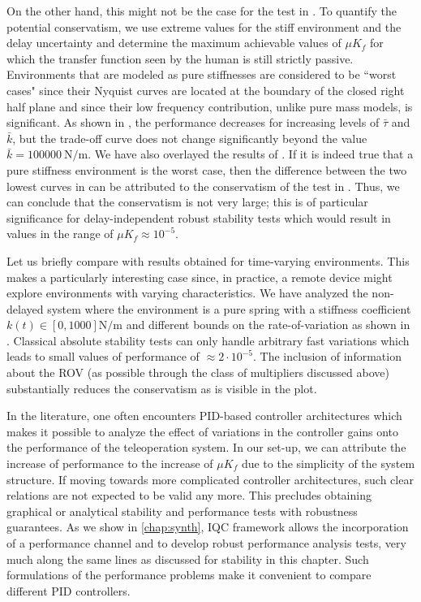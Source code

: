 On the other hand, this might not be the case for the test in . To
quantify the potential conservatism, we use extreme values for
the stiff environment and the delay uncertainty and determine
the maximum achievable values of $\mu K_f$ for which the transfer
function seen by the human is still strictly passive. Environments that
are modeled as pure stiffnesses are considered to be ``worst
cases" since their Nyquist curves are located at the boundary
of the closed right half plane and since their low frequency
contribution, unlike pure mass models, is significant. As shown in
, the performance decreases for increasing
levels of $\bar{\tau}$ and $\bar{k}$, but the trade-off curve does not change
significantly beyond the value $\bar{k} = \SI{100000}{\newton\per\metre}$. We have
also overlayed the results of . If it is indeed true
that a pure stiffness environment is the worst case, then the
difference between the two lowest curves in  can
be attributed to the conservatism of the test in .
Thus, we can conclude that the conservatism is not very large; this is of particular
significance for delay-independent robust stability tests which
would result in values in the range of $\mu K_f \approx 10^{-5}$.


Let us briefly compare with results obtained for time-varying
environments. This makes a particularly interesting
case since, in practice, a remote device might explore environments
with varying characteristics. We have analyzed
the non-delayed system where the environment is a pure
spring with a stiffness coefficient $k(t) \in [0,1000]\si{\newton\per\metre}$ and
different bounds on the rate-of-variation as shown in .
Classical absolute stability tests can only handle arbitrary
fast variations which leads to small values of performance
of $\approx 2\cdot 10^{-5}$. The inclusion of information about the ROV
(as possible through the class of multipliers discussed above)
substantially reduces the conservatism as is visible in the plot.



In the literature, one often encounters PID-based controller
architectures which makes it possible to analyze the effect
of variations in the controller gains onto the performance of
the teleoperation system. In our set-up, we can attribute the increase of performance to the
increase of $\mu K_f$ due to the simplicity of the system structure.
If moving towards more complicated controller architectures,
such clear relations are not expected to be valid any more.
This precludes obtaining graphical or analytical stability and
performance tests with robustness guarantees. As we show in \cref{chap:synth},
 IQC framework allows the incorporation of a performance channel and to develop
robust performance analysis tests, very much along the same
lines as discussed for stability in this chapter. Such formulations
of the performance problems make it convenient to compare 
different PID controllers. 

